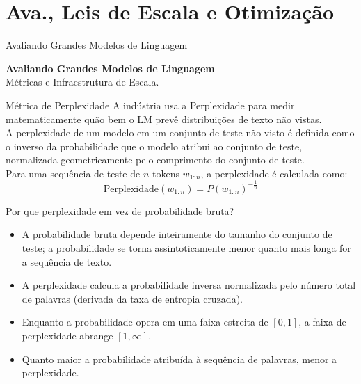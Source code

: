 \documentclass[aspectratio=169]{beamer}
\begin{document}
\section{Ava., Leis de Escala e Otimização}

\begin{frame}{Avaliando Grandes Modelos de Linguagem}
    \begin{center}
        \huge \textbf{Avaliando Grandes Modelos de Linguagem}\\
        \vspace{0.5cm}
        \Large Métricas e Infraestrutura de Escala.
    \end{center}
\end{frame}

\begin{frame}{Métrica de Perplexidade}\justifying
    A indústria usa a Perplexidade para medir matematicamente quão bem o LM prevê distribuições de texto não vistas. \\
    \vspace{0.3cm}
    A perplexidade de um modelo em um conjunto de teste não visto é definida como o inverso da probabilidade que o modelo atribui ao conjunto de teste, normalizada geometricamente pelo comprimento do conjunto de teste. \\
    \vspace{0.3cm}
    Para uma sequência de teste de $n$ tokens $w_{1:n}$, a perplexidade é calculada como:
    \[ \text{Perplexidade}(w_{1:n}) = P(w_{1:n})^{-\frac{1}{n}} \]
\end{frame}

\begin{frame}{Por que perplexidade em vez de probabilidade bruta?}\justifying
    \begin{itemize}
        \item A probabilidade bruta depende inteiramente do tamanho do conjunto de teste; a probabilidade se torna assintoticamente menor quanto mais longa for a sequência de texto.
        \item A perplexidade calcula a probabilidade inversa normalizada pelo número total de palavras (derivada da taxa de entropia cruzada).
        \item Enquanto a probabilidade opera em uma faixa estreita de $[0, 1]$, a faixa de perplexidade abrange $[1, \infty]$.
        \item Quanto maior a probabilidade atribuída à sequência de palavras, menor a perplexidade.
    \end{itemize}
\end{frame}
\end{document}
